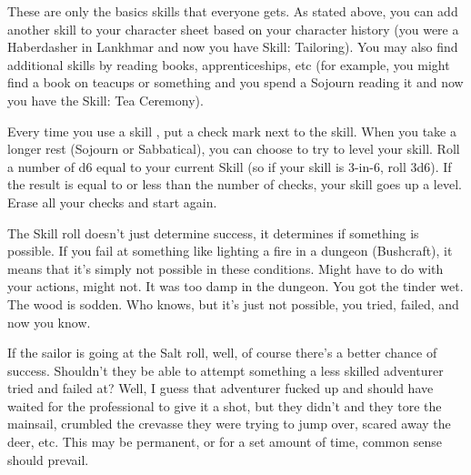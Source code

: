 {  These are only the basics skills that everyone gets.  As stated above, you can add another skill to your character sheet based on your character history (you were a Haberdasher in Lankhmar and now you have Skill: Tailoring).  You may also find additional skills by reading books, apprenticeships, etc (for example, you might find a book on teacups or something and you spend a Sojourn reading it and now you have the Skill: Tea Ceremony).
  
  \cbreak

  Every time you use a skill , put a check mark next to the skill. When you take a longer rest (Sojourn or Sabbatical), you can choose to try to level your skill.  Roll a number of d6 equal to your current Skill (so if your skill is 3-in-6, roll 3d6). If the result is equal to or less than the number of checks, your skill goes up a level. Erase all your checks and start again.



  



  The Skill roll doesn't just determine success, it determines if something is possible.  If you fail at something like lighting a fire in a dungeon (Bushcraft), it means that it's simply not possible in these conditions.  Might have to do with your actions, might not. It was too damp in the dungeon. You got the tinder wet.  The wood is sodden. Who knows, but it's just not possible, you tried, failed, and now you know. 

  If the sailor is going at the Salt roll, well, of course there's a better chance of success. Shouldn't they be able to attempt something a less skilled adventurer tried and failed at? Well, I guess that adventurer fucked up and should have waited for the professional to give it a shot, but they didn't and they tore the mainsail, crumbled the crevasse they were trying to jump over, scared away the deer, etc. This may be permanent, or for a set amount of time, common sense should prevail.

}
